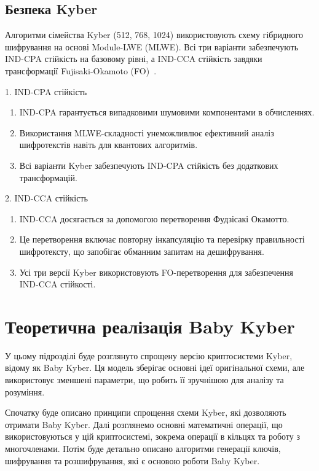 \subsection*{Безпека Kyber}

Алгоритми сімейства Kyber (512, 768, 1024) використовують схему гібридного шифрування на основі Module-LWE (MLWE). Всі три варіанти забезпечують IND-CPA стійкість на базовому рівні, а IND-CCA стійкість завдяки трансформації Fujisaki-Okamoto (FO)~\cite{KyberNISTRound3}.

1. IND-CPA стійкість~\cite{ScienceDirect2023}
\begin{enumerate}[label=\alph*)]
    \item IND-CPA гарантується випадковими шумовими компонентами в обчисленнях.
    \item Використання MLWE-складності унеможливлює ефективний аналіз шифротекстів навіть для квантових алгоритмів.
    \item Всі варіанти Kyber забезпечують IND-CPA стійкість без додаткових трансформацій.
\end{enumerate}

2. IND-CCA стійкість~\cite{KyberCCA}
\begin{enumerate}[label=\alph*)]
    \item IND-CCA досягається за допомогою перетворення Фудзісакі Окамотто.
    \item Це перетворення включає повторну інкапсуляцію та перевірку правильності шифротексту, що запобігає обманним запитам на дешифрування.
    \item Усі три версії Kyber використовують FO-перетворення для забезпечення IND-CCA стійкості.
\end{enumerate}

\section{Теоретична реалізація Baby Kyber}

У цьому підрозділі буде розглянуто спрощену версію криптосистеми Kyber, відому як Baby Kyber. Ця модель зберігає основні ідеї оригінальної схеми, але використовує зменшені параметри, що робить її зручнішою для аналізу та розуміння.  

Спочатку буде описано принципи спрощення схеми Kyber, які дозволяють отримати Baby Kyber. Далі розглянемо основні математичні операції, що використовуються у цій криптосистемі, зокрема операції в кільцях та роботу з многочленами. Потім буде детально описано алгоритми генерації ключів, шифрування та розшифрування, які є основою роботи Baby Kyber.  


